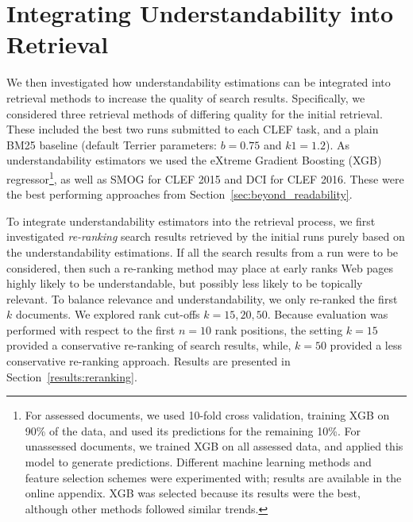 \section{Integrating Understandability into Retrieval}
\label{sec:experiments}


We then investigated how understandability estimations can be integrated into retrieval methods to increase the quality of search results. %
Specifically, we considered three retrieval methods of differing quality for the initial retrieval. These included the best two runs submitted to each CLEF task, and a plain BM25 baseline (default Terrier parameters: $b=0.75$ and $k1=1.2$). As understandability estimators we used the eXtreme Gradient Boosting (XGB) regressor\footnote{For assessed documents, we used 10-fold cross validation, training XGB on 90\% of the data, and used its predictions for the remaining 10\%. For unassessed documents, we trained XGB on all assessed data, and applied this model to generate predictions. Different machine learning methods and feature selection schemes were experimented with; results are available in the online appendix. XGB was selected because its results were the best, although other methods followed similar trends.}\cite{chen16}, as well as SMOG for CLEF 2015 and DCI for CLEF 2016. These were the best performing approaches from Section~\ref{sec:beyond_readability}.

To integrate understandability estimators into the retrieval process, we first investigated \textit{re-ranking} search results retrieved by the initial runs purely based on the understandability estimations. 
If all the search results from a run were to be considered, then such a re-ranking method may place at early ranks Web pages highly likely to be understandable, but possibly less likely to be topically relevant. To balance relevance and understandability, we only re-ranked the first $k$ documents. We explored rank cut-offs $k = 15, 20, 50$. Because evaluation was performed with respect to the first $n=10$ rank positions, the setting $k=15$ provided a conservative re-ranking of search results, while, $k=50$ provided a less conservative re-ranking approach. Results are presented in Section~\ref{results:reranking}.

